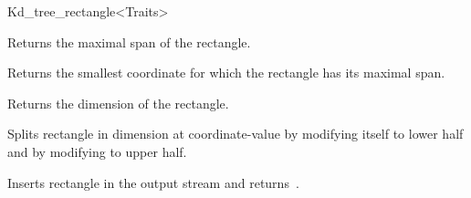 \begin{ccRefClass}{Kd_tree_rectangle<Traits>}
\begin{ccAdvanced}
 
{Returns the maximal span of the rectangle.}

{Returns the smallest coordinate for which the rectangle has its maximal span.}

{Returns the dimension of the rectangle.}

{Splits rectangle in dimension  at coordinate-value  
 by modifying itself to lower half and by modifying  to upper half.} 


{Inserts rectangle  in the output stream  and returns~.}


\end{ccAdvanced}


\end{ccRefClass}



